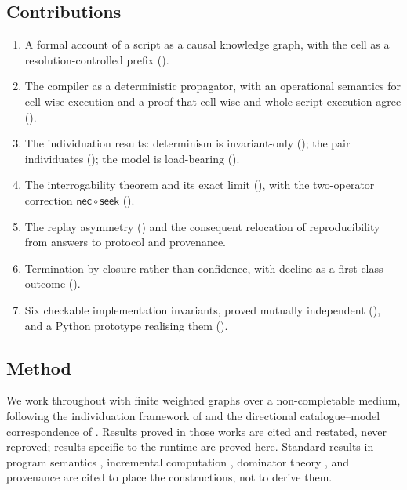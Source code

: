 \documentclass[twocolumn,11pt,a4paper]{article}
\theoremstyle{sup}
\theoremstyle{definition}
\theoremstyle{remark}
\newcommand{\seek}{\mathsf{seek}}
\newcommand{\nec}{\mathsf{nec}}
\begin{document}
\subsection{Contributions}

\begin{enumerate}[leftmargin=1.4em,itemsep=2pt]
\item A formal account of a script as a causal knowledge graph, with the
cell as a resolution-controlled prefix ().
\item The compiler as a deterministic propagator, with an operational
semantics for cell-wise execution and a proof that cell-wise and
whole-script execution agree ().
\item The individuation results: determinism is invariant-only
(); the pair individuates
(); the model is load-bearing
().
\item The interrogability theorem and its exact limit
(), with the two-operator correction
$\nec\circ\seek$ ().
\item The replay asymmetry () and the consequent
relocation of reproducibility from answers to protocol and provenance.
\item Termination by closure rather than confidence, with decline as a
first-class outcome ().
\item Six checkable implementation invariants, proved mutually independent
(), and a Python prototype realising them
().
\end{enumerate}

\subsection{Method}

We work throughout with finite weighted graphs over a non-completable medium,
following the individuation framework of \citet{sachikonye2025residue} and the
directional catalogue--model correspondence of
\citet{sachikonye2025directional}. Results proved in those works are cited and
restated, never reproved; results specific to the runtime are proved here.
Standard results in program semantics \citep{plotkin1981,winskel1993},
incremental computation \citep{acar2006}, dominator theory
\citep{lengauer1979}, and provenance \citep{cheney2009} are cited to place the
constructions, not to derive them.
\end{document}
